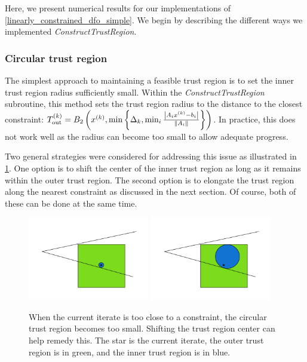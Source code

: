 \documentclass{article}
\begin{document}
Here, we present numerical results for our implementations of \cref{linearly_constrained_dfo_simple}.
We begin by describing the different ways we implemented \emph{ConstructTrustRegion}.

\subsubsection{Circular trust region}

The simplest approach to maintaining a feasible trust region is to set the inner trust region radius sufficiently small.
Within the \emph{ConstructTrustRegion} subroutine, this method sets the trust region radius to the distance to the closest constraint:
${T_{\text{out}}^{(k)}} = B_2\left(x^{(k)}, \min\left\{\Delta_k, \min_{i}\frac{\left|A_ix^{(k)} - b_i\right|}{\left\|A_i\right\|} \right\}\right)$.
In practice, this does not work well as the radius can become too small to allow adequate progress.

Two general strategies were considered for addressing this issue as illustrated in \cref{options_basis}.
One option is to shift the center of the inner trust region as long as it remains within the outer trust region.
The second option is to elongate the trust region along the nearest constraint as discussed in the next section.
Of course, both of these can be done at the same time.


\begin{figure}[ht]
    \centering
    \includegraphics[width=200px]{images/small_circle.png}
    \includegraphics[width=200px]{images/shifted_center.png}
    \caption[The advantage of not requiring the sample region center to be the trust region center.]{
    	When the current iterate is too close to a constraint, the circular trust region becomes too small.
    	Shifting the trust region center can help remedy this.
    	The star is the current iterate, the outer trust region is in green, and the inner trust region is in blue.
    }
    \label{options_basis}
\end{figure}
\end{document}
